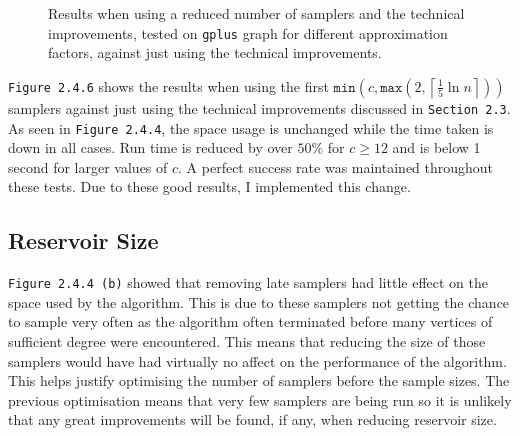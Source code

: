 \documentclass[11pt,twoside,a4paper]{report}
\begin{document}
\begin{figure}[H]
	\label{Figure 7}
	\caption{Results when using a reduced number of samplers and the technical improvements, tested on \texttt{gplus} graph for different approximation factors, against just using the technical improvements.}
\end{figure}

\par \texttt{Figure 2.4.6} shows the results when using the first $\mathtt{min}\left(c,\mathtt{max}\left(2,\left\lceil\frac15\ln n\right\rceil\right)\right)$ samplers against just using the technical improvements discussed in \texttt{Section 2.3}. As seen in \texttt{Figure 2.4.4}, the space usage is unchanged while the time taken is down in all cases. Run time is reduced by over $50\%$ for $c\geq 12$ and is below 1 second for larger values of $c$. A perfect success rate was maintained throughout these tests. Due to these good results, I implemented this change.
\subsection{Reservoir Size}

\par \texttt{Figure 2.4.4 (b)} showed that removing late samplers had little effect on the space used by the algorithm. This is due to these samplers not getting the chance to sample very often as the algorithm often terminated before many vertices of sufficient degree were encountered. This means that reducing the size of those samplers would have had virtually no affect on the performance of the algorithm. This helps justify optimising the number of samplers before the sample sizes. The previous optimisation means that very few samplers are being run so it is unlikely that any great improvements will be found, if any, when reducing reservoir size.
\end{document}
